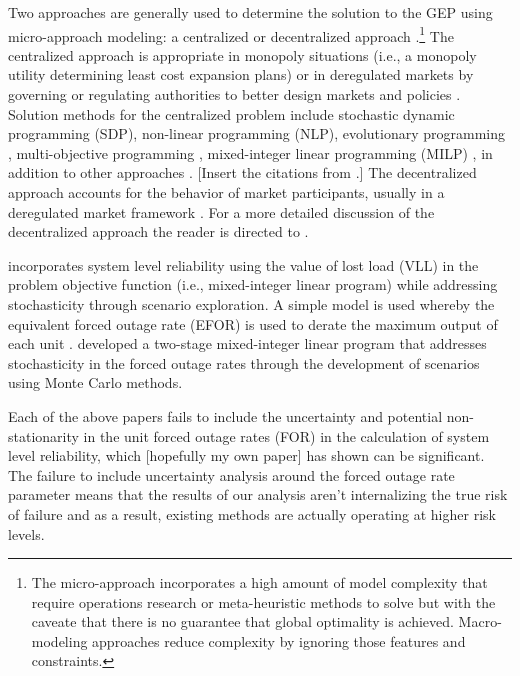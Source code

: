 \documentclass[10pt]{amsart}
\begin{document}
Two approaches are generally used to determine the solution to the GEP using micro-approach modeling: a centralized or decentralized approach \parencite{bakirtzis:2012aa}.\footnote{The micro-approach incorporates a high amount of model complexity that require operations research or meta-heuristic methods to solve but with the caveate that there is no guarantee that global optimality is achieved. Macro-modeling approaches reduce complexity by ignoring those features and constraints.} 
The centralized approach is appropriate in monopoly situations (i.e., a monopoly utility determining least cost expansion plans) or in deregulated markets by governing or regulating authorities to better design markets and policies \parencite{bakirtzis:2012aa}.
Solution methods for the centralized problem include stochastic dynamic programming (SDP)\parencite{}, non-linear programming (NLP)\parencite{}, evolutionary programming \parencite{}, multi-objective programming \parencite{}, mixed-integer linear programming (MILP) \parencite{}, in addition to other approaches \parencite{}\parencite{bakirtzis:2012aa}.  
[Insert the citations from \cite{bakirtzis:2012aa}.]
The decentralized approach accounts for the behavior of market participants, usually in a deregulated market framework \parencite{bakirtzis:2012aa}. 
For a more detailed discussion of the decentralized approach the reader is directed to \cite{bakirtzis:2012aa}. 

\cite{bakirtzis:2012aa} incorporates system level reliability using the value of lost load (VLL) in the problem objective function (i.e., mixed-integer linear program) while addressing stochasticity through scenario exploration. 
A simple model is used whereby the equivalent forced outage rate (EFOR) is used to derate the maximum output of each unit \parencite{bakirtzis:2012aa}. 
\cite{tekiner:2010aa} developed a two-stage mixed-integer linear program that addresses stochasticity in the forced outage rates through the development of scenarios using Monte Carlo methods. 

Each of the above papers fails to include the uncertainty and potential non-stationarity in the unit forced outage rates (FOR) in the calculation of system level reliability, which \cite{} [hopefully my own paper] has shown can be significant. 
The failure to include uncertainty analysis around the forced outage rate parameter means that the results of our analysis aren't internalizing the true risk of failure and as a result, existing methods are actually operating at higher risk levels. 
 
\end{document}
